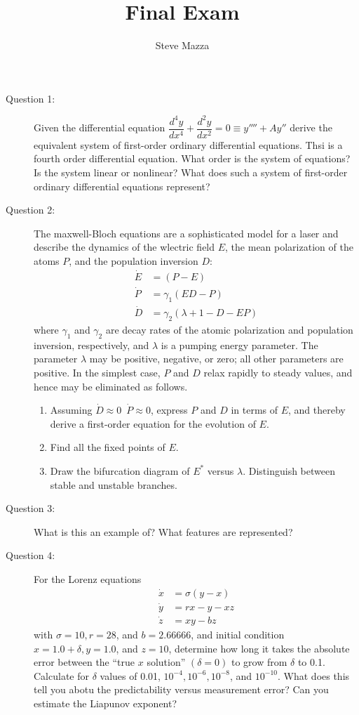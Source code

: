 \documentclass[letterpaper,10pt]{article}
\title{Final Exam}
\author{Steve Mazza}
\begin{document}
\maketitle

\begin{description}
\item[Question 1:]
Given the differential equation $\dfrac{d^4y}{dx^4}+\dfrac{d^2y}{dx^2}=0\equiv y''''+Ay''$ derive the equivalent system of first-order ordinary differential equations.  Thsi is a fourth order differential equation.  What order is the system of equations?  Is the system linear or nonlinear?  What does such a system of first-order ordinary differential equations represent?

\item[Question 2:]
The maxwell-Bloch equations are a sophisticated model for a laser and describe the dynamics of the wlectric field $E$, the mean polarization of the atoms $P$, and the population inversion $D$:
\begin{align*}
\dot{E} &= (P-E) \\
\dot{P} &= \gamma_1(ED-P) \\
\dot{D} &= \gamma_2(\lambda+1-D-EP)
\end{align*}
where $\gamma_1$ and $\gamma_2$ are decay rates of the atomic polarization and population inversion, respectively, and $\lambda$ is a pumping energy parameter.  The parameter $\lambda$ may be positive, negative, or zero; all other parameters are positive.  In the simplest case, $P$ and $D$ relax rapidly to steady values, and hence may be eliminated as follows.
\begin{enumerate}
\item Assuming $\dot{D}\approx 0$\ $\dot{P}\approx 0$, express $P$ and $D$ in terms of $E$, and thereby derive a first-order equation for the evolution of $E$.
\item Find all the fixed points of $E$.
\item Draw the bifurcation diagram of $E^*$ versus $\lambda$.  Distinguish between stable and unstable branches.
\end{enumerate}

\item[Question 3:]
What is this an example of?  What features are represented?

\item[Question 4:]
For the Lorenz equations
\begin{align*}
\dot{x} &= \sigma(y-x) \\
\dot{y} &= rx-y-xz \\
\dot{z} &= xy-bz
\end{align*}
with $\sigma=10, r=28$, and $b=2.66666$, and initial condition $x=1.0+\delta, y=1.0$, and $z=10$, determine how long it takes the absolute error between the ``true $x$ solution'' $(\delta=0)$ to grow from $\delta$ to 0.1. Calculate for $\delta$ values of 0.01, $10^{-4}, 10^{-6}, 10^{-8}$, and $10^{-10}$.  What does this tell you abotu the predictability versus measurement error?  Can you estimate the Liapunov exponent?


\end{description}
\end{document}
